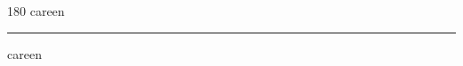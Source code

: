 
\begin{frame}
\begin{center}
\begin{turn}{180}
{\fontsize{2.5cm}{1em}\selectfont careen}
\end{turn}
\vspace{1em}\par  
\hrule
\vspace{1em}\par  
{\fontsize{2.5cm}{1em}\selectfont careen}
\end{center}
\end{frame}
